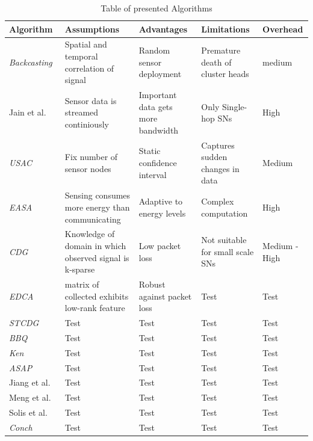 \begin{table}[h]
\caption{Table of presented Algorithms \label{table:algorithm table}}
    \begin{tabular} { |p{3.5cm}||p{3cm}|p{3cm}|p{3cm}|p{2.5cm}| }

    \hline
    Algorithm& Assumptions & Advantages & Limitations & Overhead\\
    \hline

    \textit{Backcasting}~\cite{willett2004backcasting} & Spatial and temporal
    correlation of signal & Random sensor deployment & Premature death of
    cluster heads & medium\\

    Jain et al.~\cite{jain2004adaptive} & Sensor data is streamed continiously &
    Important data gets more bandwidth & Only Single-hop \acp{SN} & High\\

    \textit{USAC}~\cite{padhy2006utility}& Fix number of sensor nodes &
    Static confidence interval~\cite{kho2007decentralised} & Captures sudden
    changes in data & Medium\\

    \textit{EASA}~\cite{srbinovski2016energy}& Sensing consumes more energy
    than communicating & Adaptive to energy levels & Complex computation &
    High\\

    \textit{CDG}~\cite{luo2009compressive}& Knowledge of domain in which
    observed signal is k-sparse & Low packet loss & Not suitable for small
    scale \acp{SN} & Medium - High\\

    \textit{EDCA}~\cite{cheng2010efficient}& matrix of collected exhibits
    low-rank feature & Robust against packet loss & Test & Test\\

    \textit{STCDG}~\cite{cheng2013stcdg}& Test & Test & Test & Test\\
    \textit{BBQ}~\cite{deshpande2004model}& Test & Test & Test & Test\\
    \textit{Ken}~\cite{chu2006approximate}& Test & Test & Test & Test\\
    \textit{ASAP}~\cite{gedik2007asap}& Test & Test & Test & Test\\
    Jiang et al.~\cite{jiang2011prediction}& Test & Test & Test & Test\\
    Meng et al.~\cite{meng2004event}& Test & Test & Test & Test\\
    Solis et al.~\cite{solis2005efficient}& Test & Test & Test & Test\\
    \textit{Conch}~\cite{silberstein2006constraint}& Test & Test & Test & Test\\
    \hline
    \end{tabular}
\end{table}

